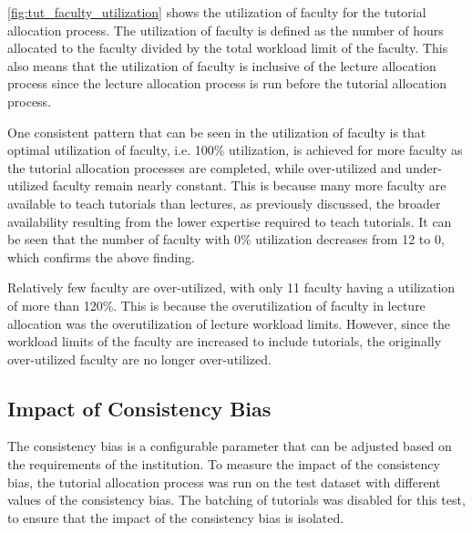 \autoref{fig:tut_faculty_utilization} shows the utilization of faculty for the tutorial allocation process. The utilization of faculty is defined as the number of hours allocated to the faculty divided by the total workload limit of the faculty. This also means that the utilization of faculty is inclusive of the lecture allocation process since the lecture allocation process is run before the tutorial allocation process.

One consistent pattern that can be seen in the utilization of faculty is that optimal utilization of faculty, i.e. 100\% utilization, is achieved for more faculty as the tutorial allocation processes are completed, while over-utilized and under-utilized faculty remain nearly constant. This is because many more faculty are available to teach tutorials than lectures, as previously discussed, the broader availability resulting from the lower expertise required to teach tutorials. It can be seen that the number of faculty with 0\% utilization decreases from 12 to 0, which confirms the above finding.

Relatively few faculty are over-utilized, with only 11 faculty having a utilization of more than 120\%. This is because the overutilization of faculty in lecture allocation was the overutilization of lecture workload limits. However, since the workload limits of the faculty are increased to include tutorials, the originally over-utilized faculty are no longer over-utilized.

\subsection{Impact of Consistency Bias}

The consistency bias is a configurable parameter that can be adjusted based on the requirements of the institution. To measure the impact of the consistency bias, the tutorial allocation process was run on the test dataset with different values of the consistency bias. The batching of tutorials was disabled for this test, to ensure that the impact of the consistency bias is isolated.

